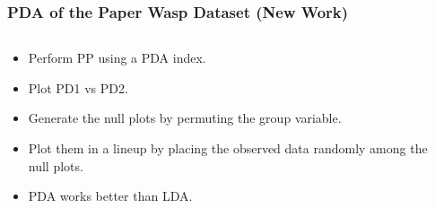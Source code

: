 \documentclass{beamer}
\begin{document}
\begin{frame}
	\frametitle{PDA of the Paper Wasp Dataset (New Work) }
	\begin{columns}
		\begin{column}{0.4\textwidth}
		  \begin{itemize}
			  \item Perform PP using a PDA index.
			\item Plot PD1 vs PD2.
			  \item Generate the null plots by permuting the group variable. 
			  \item Plot them in a lineup by placing the observed data randomly among the null plots.
			\item PDA works better than LDA.
		  \end{itemize}		
			
		\end{column}
		
		\begin{column}{0.6\textwidth}
			 \begin{center}  \end{center}
		\end{column}
	\end{columns}  

\end{frame}
\end{document}

